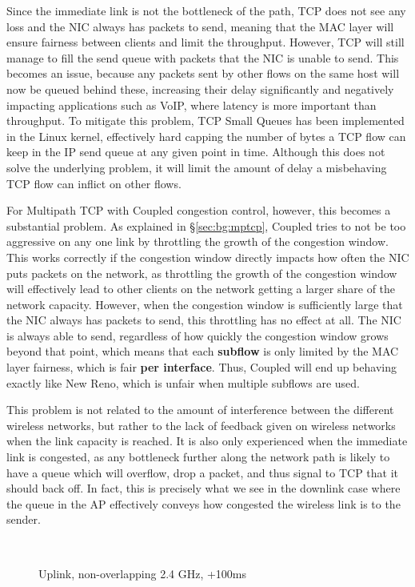 Since the immediate link is not the bottleneck of the path, TCP does not see any loss and the NIC always has packets to send, meaning that the MAC layer will ensure fairness between clients and limit the throughput.
However, TCP will still manage to fill the send queue with packets that the NIC is unable to send. This becomes an issue, because any packets sent by other flows on the same host will now be queued behind these, increasing their delay significantly and negatively impacting applications such as
VoIP, where latency is more important than throughput. To mitigate this problem, TCP Small Queues has been implemented in the Linux kernel, effectively hard capping the number of bytes a TCP flow can keep in the IP send queue at any given point in time. Although this does not solve the underlying problem, it will limit the amount of delay a misbehaving TCP flow can inflict on other flows.

For Multipath TCP with Coupled congestion control, however, this becomes a
substantial problem. As explained in \S\ref{sec:bg:mptcp}, Coupled tries to not be too 
aggressive on any one link by throttling the growth of the congestion window.
This works correctly if the congestion window directly impacts how often the NIC 
puts packets on the network, as throttling the growth of the congestion window 
will effectively lead to other clients on the network getting a larger share of 
the network capacity. However, when the congestion window is sufficiently large 
that the NIC always has packets to send, this throttling has no effect at all. 
The NIC is always able to send, regardless of how quickly the congestion window grows 
beyond that point, which means that each \textbf{subflow} is only limited by the 
MAC layer fairness, which is fair \textbf{per interface}. Thus, Coupled will end 
up behaving exactly like New Reno, which is unfair when multiple subflows are 
used.

This problem is not related to the amount of interference between the different
wireless networks, but rather to the lack of feedback given on
wireless networks when the link capacity is reached. It is also only experienced
when the immediate link is congested, as any bottleneck further along the network
path is likely to have a queue which will overflow, drop a packet, and thus
signal to TCP that it should back off. In fact, this is precisely what we see in
the downlink case where the queue in the AP effectively conveys how congested
the wireless link is to the sender.

\begin{figure}[h]
 \centering
 \subfloat[][CDF] {\
   \label{graph:fairness-rtt-up-cdf}
 }
 \\
 \subfloat[][Multipath TCP time plot] {\
   \label{graph:fairness-rtt-up-close}
 }
 \caption{Uplink, non-overlapping 2.4 GHz, +100ms}\label{graph:fairness-rtt-up}
\end{figure}

